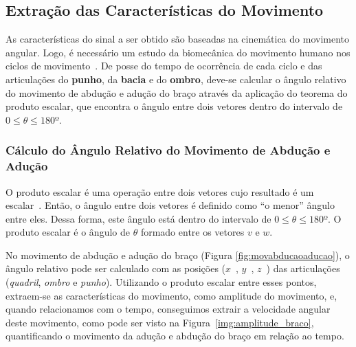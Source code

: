 \subsection{Extração das Características do Movimento} \label{sec:extracao_caracteristcas}
As características do sinal a ser obtido são baseadas na cinemática do movimento angular. Logo, é necessário um estudo da biomecânica do movimento humano nos ciclos de movimento~\cite{hamill1999bases}. De posse do tempo de ocorrência de cada ciclo e das articulações do \textbf{punho}, da \textbf{bacia} e do \textbf{ombro}, deve-se calcular o ângulo relativo do movimento de abdução e adução do braço através da aplicação do teorema do produto escalar, que encontra o ângulo entre dois vetores dentro do intervalo de $0 \leq \theta \leq 180º$.

\subsubsection{Cálculo do Ângulo Relativo do Movimento de Abdução e Adução}\label{section:movimento_abducao}
O produto escalar é uma operação entre dois vetores cujo resultado é um escalar~\cite{algebra90}. Então, o ângulo entre dois vetores é definido como ``o menor'' ângulo entre eles. Dessa forma, este ângulo está dentro do intervalo de $0 \leq \theta \leq 180º $. O produto escalar é o ângulo de $ \theta$ formado entre os vetores $ v $ e $ w $.


% 
% 

No movimento de abdução e adução do braço (Figura \ref{fig:movabducaoaducao}), o ângulo relativo pode ser calculado com as posições ($ x $\ ,  $ y $\ , $ z $\ ) das articulações (\textit{quadril}, \textit{ombro} e \textit{punho}). Utilizando o produto escalar entre esses pontos, extraem-se as características do movimento, como amplitude do movimento, e, quando relacionamos com o tempo, conseguimos extrair a velocidade angular deste movimento, como pode ser visto na Figura~\ref{img:amplitude_braco}, quantificando o movimento da adução e abdução do braço em relação ao tempo.


